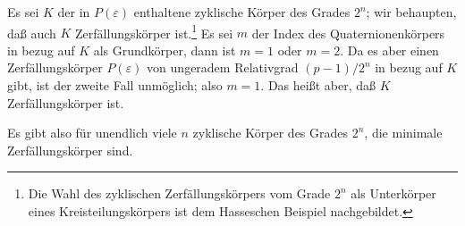 Es sei $K$ der in $P(\varepsilon)$ enthaltene zyklische Körper des Grades $2^n$; wir behaupten, daß auch $K$ Zerfällungskörper ist.\footnote{Die Wahl des zyklischen Zerfällungskörpers vom Grade $2^n$ als Unterkörper eines Kreisteilungskörpers ist dem Hasseschen Beispiel nachgebildet.} Es sei $m$ der Index des Quaternionenkörpers in bezug auf $K$ als Grundkörper, dann ist $m=1$ oder $m=2$. Da es aber einen Zerfällungskörper $P(\varepsilon)$ von ungeradem Relativgrad $(p-1)/2^n$ in bezug auf $K$ gibt, ist der zweite Fall unmöglich; also $m=1$. Das heißt aber, daß $K$ Zerfällungskörper ist.

Es gibt also für unendlich viele $n$ zyklische Körper des Grades $2^n$, die minimale Zerfällungskörper sind.
